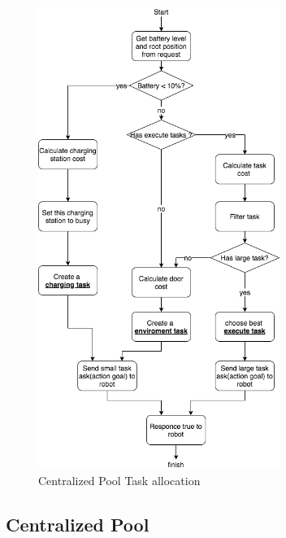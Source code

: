 \begin{figure}[htbp]
    \centering
    \includegraphics[width = 0.7\textwidth]{content/images/ch4/centralized_task_select.drawio.png}
    \caption{Centralized Pool Task allocation}
    \label{fig:centralized_task_allocation}
\end{figure}
\subsection{Centralized Pool}

